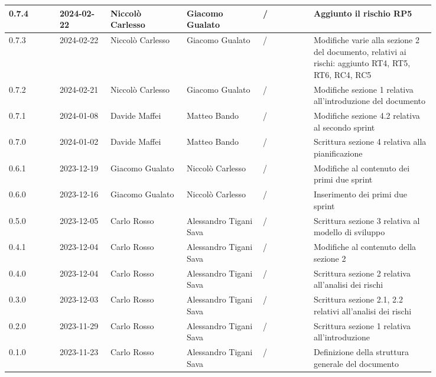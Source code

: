 {\begin{longtable}{p{0.10\linewidth}p{0.10\linewidth}p{0.15\linewidth}p{0.15\linewidth}p{0.10\linewidth}p{0.24\linewidth}}
	  \hline
	  0.7.4             & 2024-02-22    & Niccolò Carlesso   & Giacomo Gualato        & /                    & Aggiunto il rischio RP5	\\
	  \hline
	  0.7.3             & 2024-02-22    & Niccolò Carlesso   & Giacomo Gualato        & /                    & Modifiche varie alla sezione 2 del documento, relativi ai rischi:
	  aggiunto RT4, RT5, RT6, RC4, RC5	\\
	  \hline
	  0.7.2             & 2024-02-21    & Niccolò Carlesso   & Giacomo Gualato        & /                    & Modifiche sezione 1 relativa all'introduzione del documento	\\
	  \hline
	  0.7.1             & 2024-01-08    & Davide Maffei      & Matteo Bando           & /                    & Modifiche sezione 4.2 relativa al secondo sprint	\\
	  \hline
	  0.7.0             & 2024-01-02    & Davide Maffei      & Matteo Bando           & /                    & Scrittura sezione 4 relativa alla pianificazione	\\
	  \hline
	  0.6.1             & 2023-12-19    & Giacomo Gualato    & Niccolò Carlesso       & /                    & Modifiche al contenuto dei primi due sprint	\\
	  \hline
	  0.6.0             & 2023-12-16    & Giacomo Gualato    & Niccolò Carlesso       & /                    & Inserimento dei primi due sprint	\\
	  \hline
	  0.5.0             & 2023-12-05    & Carlo Rosso        & Alessandro Tigani Sava & /                    & Scrittura sezione 3 relativa al modello di sviluppo	\\
	  \hline
	  0.4.1             & 2023-12-04    & Carlo Rosso        & Alessandro Tigani Sava & /                    & Modifiche al contenuto della sezione 2	\\
	  \hline
	  0.4.0             & 2023-12-04    & Carlo Rosso        & Alessandro Tigani Sava & /                    & Scrittura sezione 2 relativa all'analisi dei rischi	\\
	  \hline
	  0.3.0             & 2023-12-03    & Carlo Rosso        & Alessandro Tigani Sava & /                    & Scrittura sezione 2.1, 2.2 relativi all'analisi dei rischi	\\
	  \hline
	  0.2.0             & 2023-11-29    & Carlo Rosso        & Alessandro Tigani Sava & /                    & Scrittura sezione 1 relativa all'introduzione	\\
	  \hline
	  0.1.0             & 2023-11-23    & Carlo Rosso        & Alessandro Tigani Sava & /                    & Definizione della struttura generale del documento	\\
	  \bottomrule
  \end{longtable}
 }

